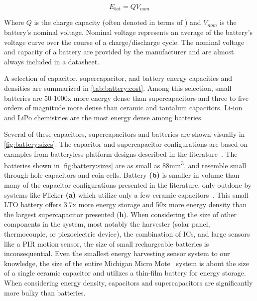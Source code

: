 $$E_{bat} = Q V_{nom}$$

Where $Q$ is the charge capacity (often denoted in terms of \si{\Ah}) and $V_{nom}$ is the battery's nominal voltage. Nominal voltage represents an average of the battery's voltage curve over the course of a charge/discharge cycle. The nominal voltage and capacity of a battery are provided by the manufacturer and are almost always included in a datasheet.

A selection of capacitor, supercapacitor, and battery energy capacities and densities are summarized in \cref{tab:battery:cost}. Among this selection, small batteries are 50-1000x more energy dense than supercapacitors and three to five orders of magnitude more dense than ceramic and tantalum capacitors. Li-ion and LiPo chemistries are the most energy dense among batteries.

Several of these capacitors, supercapacitors and batteries are shown visually in \cref{fig:battery:sizes}.
The capacitor and supercapacitor configurations are based on examples from batteryless platform designs described in the literature~\cite{hesterFlicker17, campbellEnergy14,colinReconfigurable18}.
The batteries shown in \cref{fig:battery:sizes} are
as small as 88\si{\milli\meter\cubed}, and resemble small through-hole
capacitors and coin cells. Battery \textbf{(b)} is smaller in volume than many of the capacitor
configurations presented in the literature, only outdone by systems like Flicker \textbf{(a)} which utilize only a few ceramic capacitors~\cite{hesterFlicker17}.
This small LTO battery offers 3.7x 
more energy storage and 50x more energy density than the largest supercapacitor presented (\textbf{h}). When considering the size of other components in the system, most notably the harvester (solar panel, thermocouple, or piezoelectric device), the combination of ICs, and large sensors like a PIR motion sensor, the size of small rechargeable batteries is inconsequential. 
Even the smallest energy harvesting sensor system to our knowledge, the size of the entire Michigan Micro Mote~\cite{lee13modular} system is about the size of a single ceramic capacitor and utilizes a thin-film battery for energy storage. When considering energy density, capacitors and supercapacitors are significantly more bulky than batteries.


